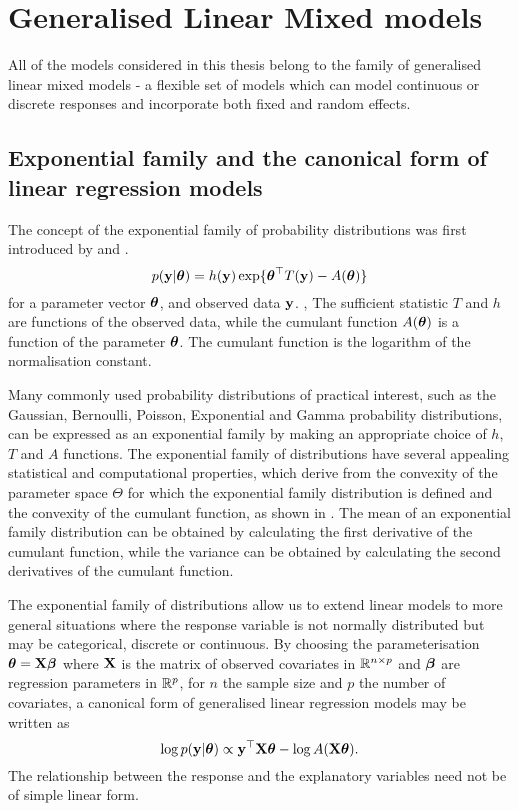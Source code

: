 \section{Generalised Linear Mixed models}
All of the models considered in this thesis belong to the family of generalised linear mixed models - a
flexible set of models which can model continuous or discrete responses and incorporate both fixed and
random effects.

\subsection{Exponential family and the canonical form of linear regression models}

The concept of the exponential family of probability distributions was first introduced by \cite{Koopman1935}
and \cite{pitman_1936}. 
\begin{equation}
	p({\bf y} | {\boldsymbol \theta}) = h({\bf y}) \exp \{ {\boldsymbol \theta}^\top T({\bf y}) - A({\boldsymbol \theta}) \}
\end{equation}
for a parameter vector ${\boldsymbol \theta}$, and observed data ${\bf y}$. , The sufficient statistic $T$ and $h$ are
functions of the observed data, while the cumulant function $A({\boldsymbol \theta})$ is a function of the parameter
${\boldsymbol \theta}$. The cumulant function is the logarithm of the normalisation constant.

Many commonly used probability distributions of practical interest, such as the Gaussian, Bernoulli, Poisson,
Exponential and Gamma probability distributions, can be expressed as an exponential family by making an
appropriate choice of $h$, $T$ and $A$ functions. The exponential family of distributions have several
appealing statistical and computational properties, which derive from the convexity of the parameter space
$\Theta$ for which the exponential family distribution is defined and the convexity of the cumulant function,
as shown in \cite{Jordan2010}. The mean of an exponential family distribution can be obtained by calculating
the first derivative of the cumulant function, while the variance can be obtained by calculating the second
derivatives of the cumulant function.

The exponential family of distributions allow us to extend linear models to more general situations where the
response variable is not normally distributed but may be categorical, discrete or continuous.  By choosing the
parameterisation ${\boldsymbol \theta} = {\bf X} {\boldsymbol \beta}$ where ${\bf X}$ is the matrix of observed covariates in ${\mathbb{R}}^{n \times p}$
and ${\boldsymbol \beta}$ are regression parameters in ${\mathbb{R}}^p$, for $n$ the sample size and $p$ the number of covariates, a
canonical form of generalised linear regression models may be written as
\begin{equation}
	\log p({\bf y} | {\boldsymbol \theta}) \propto {\bf y}^\top {\bf X} {\boldsymbol\theta} - \log A({\bf X} {\boldsymbol \theta}).
\end{equation}
The relationship between the response and the explanatory variables need not be of simple linear form.

